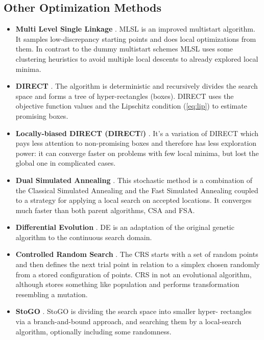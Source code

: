 \subsection{Other Optimization Methods}
\begin{itemize}
  \item \textbf{Multi Level Single Linkage} \cite{Kan1987StochasticGO}. MLSL is an improved
multistart algorithm.
  It samples low-discrepancy starting points and does local optimizations from them. In contrast to
the dummy multistart schemes
  MLSL uses some clustering heuristics to avoid multiple local descents to already explored local
minima.

  \item \textbf{DIRECT} \cite{Jones2009}. The algorithm is deterministic and recursively divides
the search space and forms a tree of hyper-rectangles (boxes). DIRECT uses the objective function
values and the Lipschitz condition (\ref{eq:lip}) to estimate promising boxes.

  \item \textbf{Locally-biased DIRECT (DIRECT$l$)} \cite{Gablonsky2001}. It's a variation of
DIRECT which pays less attention to non-promising boxes and therefore
  has less exploration power: it can converge faster on problems with few local minima, but lost the
global one in complicated cases.

  \item \textbf{Dual Simulated Annealing} \cite{XIANG1997216}. This stochastic method is a
combination of the Classical Simulated Annealing and the Fast Simulated Annealing coupled to a
strategy for applying a local search on accepted locations. It converges much faster than both parent
algorithms, CSA and FSA.

  \item \textbf{Differential Evolution} \cite{Storn1997}. DE is an adaptation of the original genetic
algorithm to
  the continuous search domain.

  \item \textbf{Controlled Random Search} \cite{Price1983}. The CRS starts with a set of random
points and then defines
  the next trial point in relation to a simplex chosen randomly from a stored configuration of points.
CRS in not an
  evolutional algorithm, although stores something like population and performs transformation
resembling a mutation.

  \item \textbf{StoGO} \cite{Madsen1998}. StoGO is dividing the search space into smaller hyper-
rectangles via a branch-and-bound approach,
  and searching them by a local-search algorithm, optionally including some randomness.

\end{itemize}


